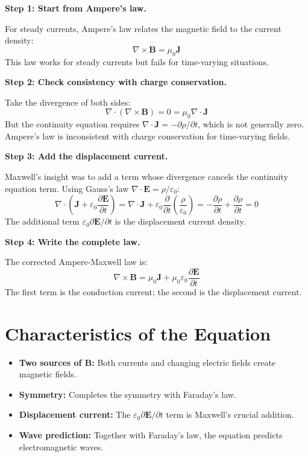 \textbf{Step 1: Start from Ampere's law.}

For steady currents, Ampere's law relates the magnetic field to the current density:
\begin{equation}
\nabla \times \mathbf{B} = \mu_0 \mathbf{J}
\end{equation}
This law works for steady currents but fails for time-varying situations.

\textbf{Step 2: Check consistency with charge conservation.}

Take the divergence of both sides:
\begin{equation}
\nabla \cdot (\nabla \times \mathbf{B}) = 0 = \mu_0 \nabla \cdot \mathbf{J}
\end{equation}
But the continuity equation requires $\nabla \cdot \mathbf{J} = -\partial \rho/\partial t$, which is not generally zero. Ampere's law is inconsistent with charge conservation for time-varying fields.

\textbf{Step 3: Add the displacement current.}

Maxwell's insight was to add a term whose divergence cancels the continuity equation term. Using Gauss's law $\nabla \cdot \mathbf{E} = \rho/\varepsilon_0$:
\begin{equation}
\nabla \cdot \left(\mathbf{J} + \varepsilon_0 \frac{\partial \mathbf{E}}{\partial t}\right) = \nabla \cdot \mathbf{J} + \varepsilon_0 \frac{\partial}{\partial t}\left(\frac{\rho}{\varepsilon_0}\right) = -\frac{\partial \rho}{\partial t} + \frac{\partial \rho}{\partial t} = 0
\end{equation}
The additional term $\varepsilon_0 \partial \mathbf{E}/\partial t$ is the displacement current density.

\textbf{Step 4: Write the complete law.}

The corrected Ampere-Maxwell law is:
\begin{equation}
\boxed{\nabla \times \mathbf{B} = \mu_0 \mathbf{J} + \mu_0 \varepsilon_0 \frac{\partial \mathbf{E}}{\partial t}}
\end{equation}
The first term is the conduction current; the second is the displacement current.

\section*{Characteristics of the Equation}

\begin{itemize}
\item \textbf{Two sources of B:} Both currents and changing electric fields create magnetic fields.
\item \textbf{Symmetry:} Completes the symmetry with Faraday's law.
\item \textbf{Displacement current:} The $\varepsilon_0 \partial \mathbf{E}/\partial t$ term is Maxwell's crucial addition.
\item \textbf{Wave prediction:} Together with Faraday's law, the equation predicts electromagnetic waves.
\end{itemize}

